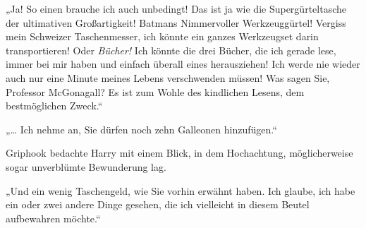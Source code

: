 „Ja! So einen brauche ich auch unbedingt! Das ist ja wie die Supergürteltasche der ultimativen Großartigkeit! Batmans Nimmervoller Werkzeuggürtel! Vergiss mein Schweizer Taschenmesser, ich könnte ein ganzes Werkzeugset darin transportieren! Oder \emph{Bücher!} Ich könnte die drei Bücher, die ich gerade lese, immer bei mir haben und einfach überall eines herausziehen! Ich werde nie wieder auch nur eine Minute meines Lebens verschwenden müssen! Was sagen Sie, Professor McGonagall? Es ist zum Wohle des kindlichen Lesens, dem bestmöglichen Zweck.“

„… Ich nehme an, Sie dürfen noch zehn Galleonen hinzufügen.“

Griphook bedachte Harry mit einem Blick, in dem Hochachtung, möglicherweise sogar unverblümte Bewunderung lag.

„Und ein wenig Taschengeld, wie Sie vorhin erwähnt haben. Ich glaube, ich habe ein oder zwei andere Dinge gesehen, die ich vielleicht in diesem Beutel aufbewahren möchte.“

